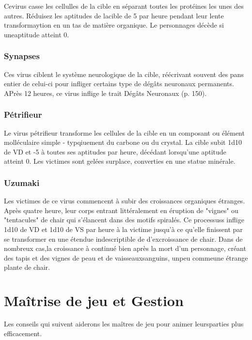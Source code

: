 {Cevirus casse les cellulles de la cible en séparant toutes les protéines les unes des autres. Réduisez les aptitudes de lacible de 5 par heure pendant leur lente transformaytion en un tas de matière organique. Le personnages décède si uneaptitude atteint 0. 

\subsubsection{Synapses} 

Ces virus ciblent le système neurologique de la cible, réécrivant souvent des pans entier de celui-ci pour infliger certains type de dégâts neuronaux permanents. APrès 12 heures, ce virus inflige le trait Dégâts Neuronaux (p. 150). 

\subsubsection{Pétrifieur} 

Le virus pétrifieur transforme les cellules de la cible en un composant ou élément molléculaire simple - typqiuement du carbone ou du crystal. La cible subit 1d10 de VD et -5 à toutes ses aptitudes par heure, décédant lorsqu'une aptitude atteint 0. Les victimes sont gelées surplace, converties en une statue minérale. 

\subsubsection{Uzumaki} 

Les victimes de ce virus commencent à subir des croissances organiques étranges. Après quatre heure, leur corps entrant littéralement en éruption de "vignes" ou "tentacules" de chair qui s'élancent dans des motifs spiralés. Ce processuss inflige 1d10 de VD et 1d10 de VS par heure à la victime jusqu'à ce qu'elle finissent par se transformer en une étendue indescriptible de d'excroissance de chair. Dans de nombreux cas,la croissance à continué bien après la mort d'un personnage, créant des tapis et des vignes de peau et de vaisseauxsanguins, unpeu commeune étrange plante de chair. 

\section{Maîtrise de jeu et Gestion } 

Les conseils qui suivent aiderons les maîtres de jeu pour animer leursparties plus efficacement. 

}
